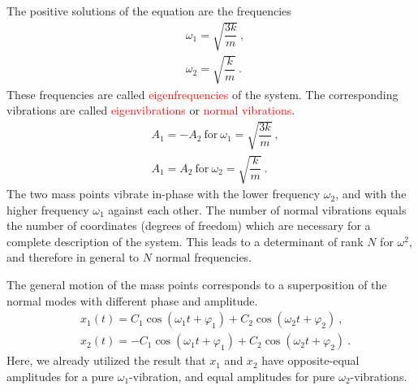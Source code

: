 \documentclass[11pt,a4paper]{article}
\begin{document}
The positive solutions of the equation are the frequencies
\begin{align*}
& \omega_1 = \sqrt{\dfrac{3k}{m}} ~, \\
& \omega_2 = \sqrt{\dfrac{k}{m}} ~. 
\end{align*}
These frequencies are called \textcolor{red}{eigenfrequencies} of the system. The corresponding vibrations are called \textcolor{red}{eigenvibrations} or \textcolor{red}{normal vibrations}. 
\begin{align}
& A_1 = -A_2 ~\text{for} ~\omega_1 = \sqrt{\dfrac{3k}{m}} ~, \\
& A_1 = A_2  ~\text{for} ~\omega_2 = \sqrt{\dfrac{k}{m}} ~. 
\end{align}
The two mass points vibrate in-phase with the lower frequency $\omega_2$, and with the higher frequency $\omega_1$ against each other. The number of normal vibrations equals the number of coordinates (degrees of freedom) which are necessary for a complete description of the system. This leads to a determinant of rank $N$ for $\omega^2$, and therefore in general to $N$ normal frequencies.

The general motion of the mass points corresponds to a superposition of the normal modes with different phase and amplitude. 
\begin{align}
& x_1 (t) = C_1 \cos(\omega_1 t +\varphi_1) +C_2 \cos(\omega_2 t +\varphi_2) ~, \\
& x_2 (t) = -C_1 \cos(\omega_1 t +\varphi_1) +C_2 \cos(\omega_2 t +\varphi_2) ~. 
\end{align}
Here, we already utilized the result that $x_1$ and $x_2$ have opposite-equal amplitudes for a pure $\omega_1$-vibration, and equal amplitudes for pure $\omega_2$-vibrations. 
\end{document}
